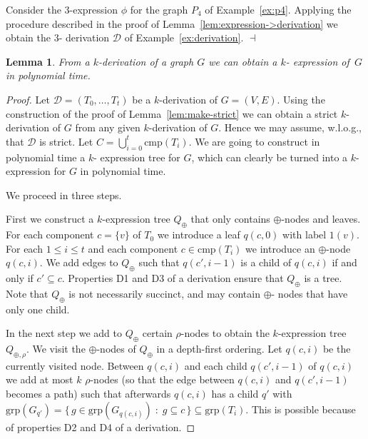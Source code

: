 \documentclass[10pt,usletter]{article}
\newtheorem{lemma}{Lemma}
\theoremstyle{remark}
\newtheorem{example}{Example}
\renewenvironment{example}{\begin{ex}}{\hfill
    $\dashv$\end{ex}\medskip}
\newcommand{\DDD}{\mathcal{D}}
\newcommand{\SB}{\{\,}\newcommand{\SM}{\;{:}\;}\newcommand{\SE}{\,\}}\newcommand{\Card}[1]{|#1|}
\newcommand{\hy}{\hbox{-}\nobreak\hskip0pt}
\newcommand{\comps}{\text{cmp}}
\newcommand{\groups}{\text{grp}}
\begin{document}
\begin{example}\label{ex:expression->derivation}
  Consider the $3$\hy expression $\phi$ for the graph $P_4$ of
  Example~\ref{ex:p4}. Applying the procedure described in the proof
  of Lemma~\ref{lem:expression->derivation} we obtain the $3$\hy
  derivation $\DDD$ of Example~\ref{ex:derivation}.
\end{example}


\begin{lemma}\label{lem:derivation->expression}
  From a $k$\hy derivation of a graph $G$ we can obtain a $k$\hy
  expression of~$G$ in polynomial time.
\end{lemma}
\begin{proof}
  Let $\DDD=(T_0,\dots,T_t)$ be a $k$\hy derivation of $G=(V,E)$.
  Using the construction of the proof of Lemma~\ref{lem:make-strict}
  we can obtain a strict $k$\hy derivation of $G$ from any given
  $k$\hy derivation of $G$. Hence we may assume, w.l.o.g., that
  $\DDD$ is strict. Let $C=\bigcup_{i=0}^t \comps(T_i)$.
  We are going to construct in polynomial time a $k$\hy
  expression tree for $G$, which can clearly be turned into a $k$\hy
  expression for $G$ in polynomial time.

  We proceed in three steps.


  First we construct a $k$\hy expression tree $Q_\oplus$ that only
  contains $\oplus$\hy nodes and leaves. For each component $c=\{v\}$ of
  $T_0$ we introduce a leaf $q(c,0)$ with label $1(v)$.
  For each $1\leq i \leq t$ and
  each component $c\in \comps(T_i)$ we introduce an $\oplus$\hy node
  $q(c,i)$. We add edges to $Q_\oplus$ such that $q(c',i-1)$ is a
  child of $q(c,i)$ if and only if $c'\subseteq c$.  Properties D1
  and D3 of a derivation ensure that $Q_\oplus$ is a tree. Note that
  $Q_\oplus$ is not necessarily succinct, and may contain $\oplus$\hy
  nodes that have only one child.


  In the next step we add to $Q_\oplus$ certain $\rho$\hy nodes to
  obtain the $k$\hy expression tree $Q_{\oplus,\rho}$.  We visit the
  $\oplus$\hy nodes of $Q_\oplus$ in a depth-first ordering. Let
  $q(c,i)$ be the currently visited node. Between $q(c,i)$ and each
  child $q(c',i-1)$ of $q(c,i)$ we add at most $k$ $\rho$\hy nodes (so
  that the edge between $q(c,i)$ and $q(c',i-1)$ becomes a path) such
  that afterwards $q(c,i)$ has a child $q'$ with $\groups(G_{q'})=\SB
  g\in \groups(G_{q(c,i)}) \SM g\subseteq c \SE \subseteq
  \groups(T_i)$. This is possible because of properties D2 and D4 of a
  derivation.
 

\end{proof}
\end{document}
